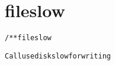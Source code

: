 \section{fileslow}
\begin{shaded}
\begin{alltt}
/** fileslow

  Call use diskslow for writing

\end{alltt}
\end{shaded}
